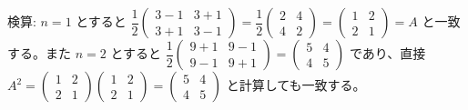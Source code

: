 検算: $n=1$ とすると $\dfrac12\begin{pmatrix}3-1 & 3+1\\3+1&3-1\end{pmatrix} = \dfrac12\begin{pmatrix}2&4\\4&2\end{pmatrix} = \begin{pmatrix}1&2\\2&1\end{pmatrix} = A$ と一致する。また $n=2$ とすると $\dfrac12\begin{pmatrix}9+1&9-1\\9-1&9+1\end{pmatrix}=\begin{pmatrix}5&4\\4&5\end{pmatrix}$ であり、直接 $A^2=\begin{pmatrix}1&2\\2&1\end{pmatrix}\begin{pmatrix}1&2\\2&1\end{pmatrix}=\begin{pmatrix}5&4\\4&5\end{pmatrix}$ と計算しても一致する。
